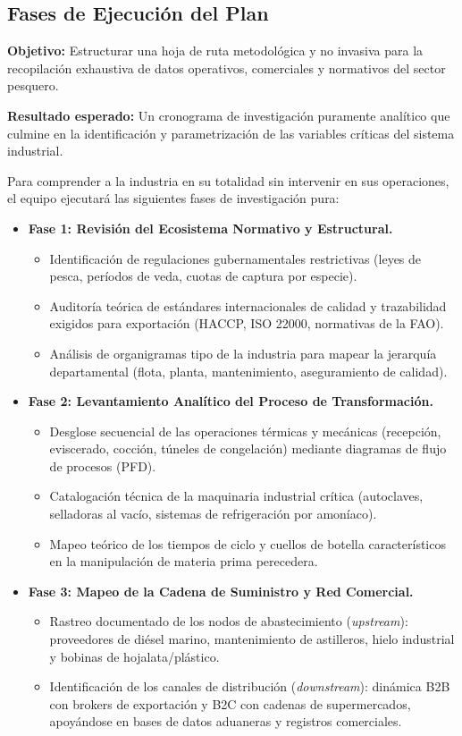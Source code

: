 \documentclass[11pt,a4paper]{article}
\newcommand{\objetivo}[1]{\noindent\textbf{\textcolor{blue!60!black}{Objetivo:}} #1\par\vspace{0.1cm}}
\newcommand{\resultado}[1]{\noindent\textbf{\textcolor{green!50!black}{Resultado esperado:}} #1\par\vspace{0.4cm}}
\begin{document}
\subsection{Fases de Ejecución del Plan}
\objetivo{Estructurar una hoja de ruta metodológica y no invasiva para la recopilación exhaustiva de datos operativos, comerciales y normativos del sector pesquero.}
\resultado{Un cronograma de investigación puramente analítico que culmine en la identificación y parametrización de las variables críticas del sistema industrial.}

Para comprender a la industria en su totalidad sin intervenir en sus operaciones, el equipo ejecutará las siguientes fases de investigación pura:

\begin{itemize}
    \item \textbf{Fase 1: Revisión del Ecosistema Normativo y Estructural.}
    \begin{itemize}[noitemsep, label=-]
        \item Identificación de regulaciones gubernamentales restrictivas (leyes de pesca, períodos de veda, cuotas de captura por especie).
        \item Auditoría teórica de estándares internacionales de calidad y trazabilidad exigidos para exportación (HACCP, ISO 22000, normativas de la FAO).
        \item Análisis de organigramas tipo de la industria para mapear la jerarquía departamental (flota, planta, mantenimiento, aseguramiento de calidad).
    \end{itemize}

    \item \textbf{Fase 2: Levantamiento Analítico del Proceso de Transformación.}
    \begin{itemize}[noitemsep, label=-]
        \item Desglose secuencial de las operaciones térmicas y mecánicas (recepción, eviscerado, cocción, túneles de congelación) mediante diagramas de flujo de procesos (PFD).
        \item Catalogación técnica de la maquinaria industrial crítica (autoclaves, selladoras al vacío, sistemas de refrigeración por amoníaco).
        \item Mapeo teórico de los tiempos de ciclo y cuellos de botella característicos en la manipulación de materia prima perecedera.
    \end{itemize}

    \item \textbf{Fase 3: Mapeo de la Cadena de Suministro y Red Comercial.}
    \begin{itemize}[noitemsep, label=-]
        \item Rastreo documentado de los nodos de abastecimiento (\textit{upstream}): proveedores de diésel marino, mantenimiento de astilleros, hielo industrial y bobinas de hojalata/plástico.
        \item Identificación de los canales de distribución (\textit{downstream}): dinámica B2B con brokers de exportación y B2C con cadenas de supermercados, apoyándose en bases de datos aduaneras y registros comerciales.
    \end{itemize}


\end{itemize}
\end{document}
